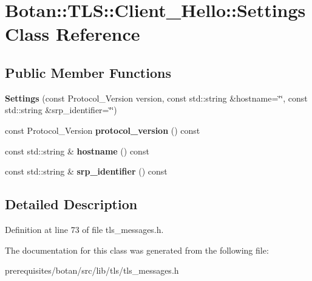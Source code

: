 \hypertarget{class_botan_1_1_t_l_s_1_1_client___hello_1_1_settings}{}\section{Botan\+:\+:T\+LS\+:\+:Client\+\_\+\+Hello\+:\+:Settings Class Reference}
\label{class_botan_1_1_t_l_s_1_1_client___hello_1_1_settings}
\subsection*{Public Member Functions}
\begin{DoxyCompactItemize}
\item 
\mbox{\label{class_botan_1_1_t_l_s_1_1_client___hello_1_1_settings_a61bdfb25a92edd0d0a24cb6f07dc519c}} 
{\bfseries Settings} (const Protocol\+\_\+\+Version version, const std\+::string \&hostname=\char`\"{}\char`\"{}, const std\+::string \&srp\+\_\+identifier=\char`\"{}\char`\"{})
\item 
\mbox{\label{class_botan_1_1_t_l_s_1_1_client___hello_1_1_settings_a832473d40546c2285cedcc82e014e822}} 
const Protocol\+\_\+\+Version {\bfseries protocol\+\_\+version} () const
\item 
\mbox{\label{class_botan_1_1_t_l_s_1_1_client___hello_1_1_settings_a6925918be4aed0beb65b681a246445d2}} 
const std\+::string \& {\bfseries hostname} () const
\item 
\mbox{\label{class_botan_1_1_t_l_s_1_1_client___hello_1_1_settings_a98c90321ba8f044adf9f321364fa6165}} 
const std\+::string \& {\bfseries srp\+\_\+identifier} () const
\end{DoxyCompactItemize}


\subsection{Detailed Description}


Definition at line 73 of file tls\+\_\+messages.\+h.



The documentation for this class was generated from the following file\+:\begin{DoxyCompactItemize}
\item 
prerequisites/botan/src/lib/tls/tls\+\_\+messages.\+h\end{DoxyCompactItemize}
